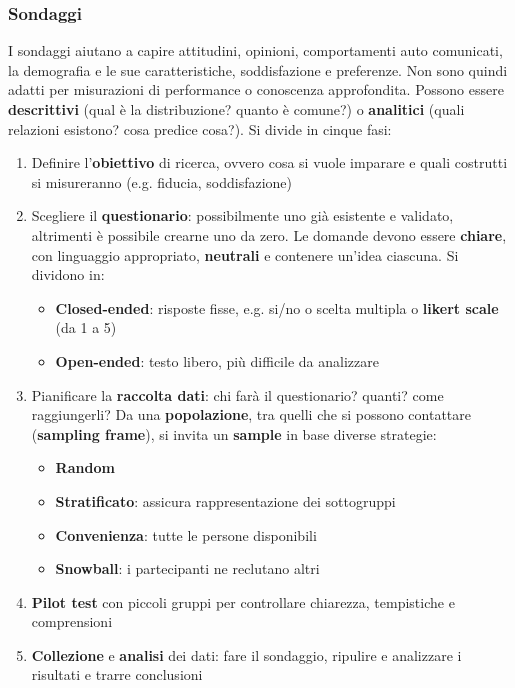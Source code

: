 \subsubsection{Sondaggi}
I sondaggi aiutano a capire attitudini, opinioni, comportamenti auto comunicati, la demografia e le sue caratteristiche, soddisfazione e preferenze. Non sono quindi adatti per misurazioni di performance o conoscenza approfondita. Possono essere \textbf{descrittivi} (qual è la distribuzione? quanto è comune?) o \textbf{analitici} (quali relazioni esistono? cosa predice cosa?). Si divide in cinque fasi:
\begin{enumerate}
	\item Definire l'\textbf{obiettivo} di ricerca, ovvero cosa si vuole imparare e quali costrutti si misureranno (e.g. fiducia, soddisfazione)
	\item Scegliere il \textbf{questionario}: possibilmente uno già esistente e validato, altrimenti è possibile crearne uno da zero. Le domande devono essere \textbf{chiare}, con linguaggio appropriato, \textbf{neutrali} e contenere un'idea ciascuna. Si dividono in:
	\begin{itemize}
		\item \textbf{Closed-ended}: risposte fisse, e.g. si/no o scelta multipla o \textbf{likert scale} (da 1 a 5)
		\item \textbf{Open-ended}: testo libero, più difficile da analizzare
	\end{itemize}
	\item Pianificare la \textbf{raccolta dati}: chi farà il questionario? quanti? come raggiungerli? Da una \textbf{popolazione}, tra quelli che si possono contattare (\textbf{sampling frame}), si invita un \textbf{sample} in base diverse strategie:
	\begin{itemize}
		\item \textbf{Random}
		\item \textbf{Stratificato}: assicura rappresentazione dei sottogruppi
		\item \textbf{Convenienza}: tutte le persone disponibili
		\item \textbf{Snowball}: i partecipanti ne reclutano altri
	\end{itemize}
	\item \textbf{Pilot test} con piccoli gruppi per controllare chiarezza, tempistiche e comprensioni
	\item \textbf{Collezione} e \textbf{analisi} dei dati: fare il sondaggio, ripulire e analizzare i risultati e trarre conclusioni
\end{enumerate}

